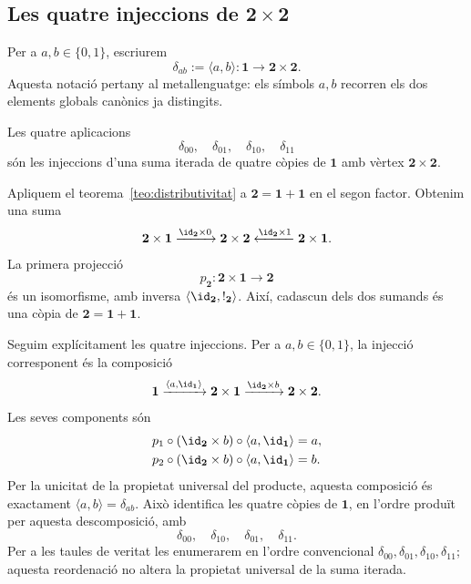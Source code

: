 \subsection{Les quatre injeccions de \texorpdfstring{\(\mathbf2\times\mathbf2\)}{2 per 2}}

Per a \(a,b\in\{0,1\}\), escriurem
\[
\delta_{ab}:=\langle a,b\rangle:
\mathbf1\to\mathbf2\times\mathbf2.
\]
Aquesta notació pertany al metallenguatge: els símbols \(a,b\) recorren
els dos elements globals canònics ja distingits.

\begin{proposicio}\label{prop:quatre-injeccions}
Les quatre aplicacions
\[
\delta_{00},\quad
\delta_{01},\quad
\delta_{10},\quad
\delta_{11}
\]
són les injeccions d'una suma iterada de quatre còpies de
\(\mathbf1\) amb vèrtex \(\mathbf2\times\mathbf2\).
\end{proposicio}

\begin{prova}
Apliquem el teorema~\ref{teo:distributivitat} a
\(\mathbf2=\mathbf1+\mathbf1\) en el segon factor. Obtenim una suma
\[
\mathbf2\times\mathbf1
\xrightarrow{\id_{\mathbf2}\times0}
\mathbf2\times\mathbf2
\xleftarrow{\id_{\mathbf2}\times1}
\mathbf2\times\mathbf1.
\]
La primera projecció
\[
p_{\mathbf2}:\mathbf2\times\mathbf1\to\mathbf2
\]
és un isomorfisme, amb inversa
\(\langle\id_{\mathbf2},{!}_{\mathbf2}\rangle\). Així, cadascun dels
dos sumands és una còpia de
\(\mathbf2=\mathbf1+\mathbf1\).

Seguim explícitament les quatre injeccions. Per a
\(a,b\in\{0,1\}\), la injecció corresponent és la composició
\[
\mathbf1
\xrightarrow{\langle a,\id_{\mathbf1}\rangle}
\mathbf2\times\mathbf1
\xrightarrow{\id_{\mathbf2}\times b}
\mathbf2\times\mathbf2.
\]
Les seves components són
\[
\begin{aligned}
p_1\circ
(\id_{\mathbf2}\times b)
\circ\langle a,\id_{\mathbf1}\rangle&=a,\\
p_2\circ
(\id_{\mathbf2}\times b)
\circ\langle a,\id_{\mathbf1}\rangle&=b.
\end{aligned}
\]
Per la unicitat de la propietat universal del producte, aquesta
composició és exactament \(\langle a,b\rangle=\delta_{ab}\). Això identifica les quatre còpies de \(\mathbf1\), en l'ordre produït
per aquesta descomposició, amb
\[
\delta_{00},\quad\delta_{10},\quad\delta_{01},\quad\delta_{11}.
\]
Per a les taules de veritat les enumerarem en l'ordre convencional
\(\delta_{00},\delta_{01},\delta_{10},\delta_{11}\); aquesta
reordenació no altera la propietat universal de la suma iterada.
\end{prova}

